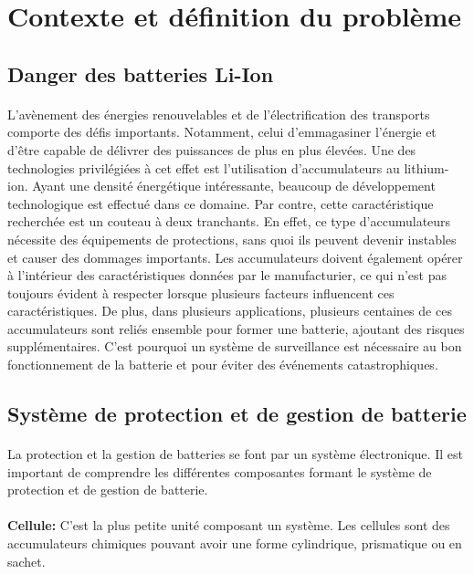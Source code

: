\section{Contexte et définition du problème}

	\subsection{Danger des batteries Li-Ion}
	\paragraph{}
	L'avènement des énergies renouvelables et de l'électrification des transports comporte des défis importants. Notamment, celui d'emmagasiner l'énergie et d'être capable de délivrer des puissances de plus en plus élevées. Une des technologies privilégiées à cet effet est l'utilisation d'accumulateurs au lithium-ion. Ayant une densité énergétique intéressante, beaucoup de développement technologique est effectué dans ce domaine. Par contre, cette caractéristique recherchée est un couteau à deux tranchants. En effet, ce type d'accumulateurs nécessite des équipements de protections, sans quoi ils peuvent devenir instables et causer des dommages importants. Les accumulateurs doivent également opérer à l'intérieur des caractéristiques données par le manufacturier, ce qui n'est pas toujours évident à respecter lorsque plusieurs facteurs influencent ces caractéristiques. De plus, dans plusieurs applications, plusieurs centaines de ces accumulateurs sont reliés ensemble pour former une batterie, ajoutant des risques supplémentaires. C'est pourquoi un système de surveillance est nécessaire au bon fonctionnement de la batterie et pour éviter des événements catastrophiques.
	
	\subsection{Système de protection et de gestion de batterie}
	\paragraph{}
	La protection et la gestion de batteries se font par un système électronique. Il est important de comprendre les différentes composantes formant le système de protection et de gestion de batterie.
	
	\paragraph{}   \textbf{Cellule:}
	 C'est la plus petite unité composant un système. Les cellules sont des accumulateurs chimiques pouvant avoir une forme cylindrique, prismatique ou en sachet.  
	
